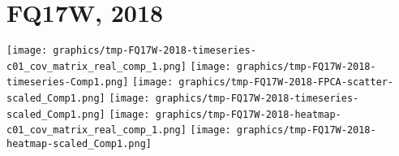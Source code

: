 
\section{FQ17W, 2018}
\setcounter{theorem}{0}

\renewcommand{\theenumi}{\roman{enumi}}
\renewcommand{\labelenumi}{\textnormal{(\theenumi)}$\;\;$}


\begin{center}
\begin{minipage}{7.0in}
\texttt{[image: graphics/tmp-FQ17W-2018-timeseries-c01\_cov\_matrix\_real\_comp\_1.png]}
\quad
\texttt{[image: graphics/tmp-FQ17W-2018-timeseries-Comp1.png]}
\vskip 0.5cm
\texttt{[image: graphics/tmp-FQ17W-2018-FPCA-scatter-scaled\_Comp1.png]}
\quad
\texttt{[image: graphics/tmp-FQ17W-2018-timeseries-scaled\_Comp1.png]}
\vskip 0.5cm
\texttt{[image: graphics/tmp-FQ17W-2018-heatmap-c01\_cov\_matrix\_real\_comp\_1.png]}
\quad
\texttt{[image: graphics/tmp-FQ17W-2018-heatmap-scaled\_Comp1.png]}
\end{minipage}
\end{center}


\renewcommand{\theenumi}{\roman{enumi}}
\renewcommand{\labelenumi}{\textnormal{(\theenumi)}$\;\;$}

